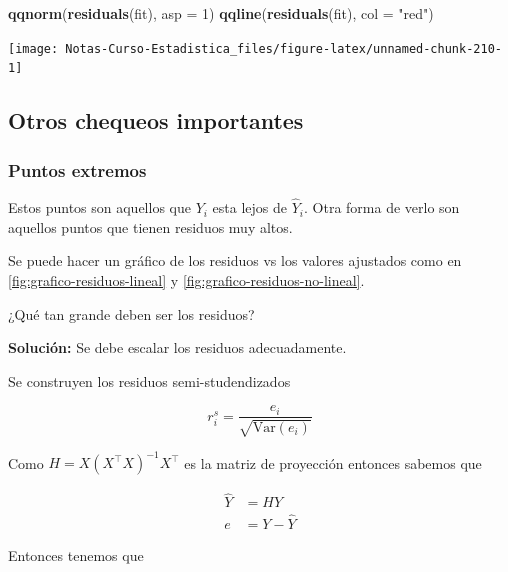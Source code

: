 \documentclass[
  12pt,
]{book}
\newenvironment{Shaded}{\begin{snugshade}}{\end{snugshade}}
\newcommand{\DataTypeTok}[1]{\textcolor[rgb]{0.13,0.29,0.53}{#1}}
\newcommand{\DecValTok}[1]{\textcolor[rgb]{0.00,0.00,0.81}{#1}}
\newcommand{\KeywordTok}[1]{\textcolor[rgb]{0.13,0.29,0.53}{\textbf{#1}}}
\newcommand{\NormalTok}[1]{#1}
\newcommand{\StringTok}[1]{\textcolor[rgb]{0.31,0.60,0.02}{#1}}
\theoremstyle{definition}
\theoremstyle{definition}
\theoremstyle{definition}
\theoremstyle{remark}
\begin{document}
\begin{Shaded}
\begin{Highlighting}[]
\KeywordTok{qqnorm}\NormalTok{(}\KeywordTok{residuals}\NormalTok{(fit), }\DataTypeTok{asp =} \DecValTok{1}\NormalTok{)}
\KeywordTok{qqline}\NormalTok{(}\KeywordTok{residuals}\NormalTok{(fit), }\DataTypeTok{col =} \StringTok{"red"}\NormalTok{)}
\end{Highlighting}
\end{Shaded}

\begin{center}\texttt{[image: Notas-Curso-Estadistica\_files/figure-latex/unnamed-chunk-210-1]} \end{center}

\hypertarget{otros-chequeos-importantes}{%
\subsection{Otros chequeos importantes}\label{otros-chequeos-importantes}}

\hypertarget{puntos-extremos}{%
\subsubsection{Puntos extremos}\label{puntos-extremos}}

Estos puntos son aquellos que \(Y_i\) esta lejos de \(\hat{Y}_i\). Otra forma de verlo son aquellos puntos que tienen residuos muy altos.

Se puede hacer un gráfico de los residuos vs los valores ajustados como en \ref{fig:grafico-residuos-lineal} y \ref{fig:grafico-residuos-no-lineal}.

¿Qué tan grande deben ser los residuos?

\textbf{Solución:} Se debe escalar los residuos adecuadamente.

Se construyen los residuos semi-studendizados

\begin{equation*}
r_{i}^{s} = \frac{e_{i}}{\sqrt{\mathrm{Var}\left(e_{i}\right)}} 
\end{equation*}

Como \(H=X(X^{\top}X)^{-1}X^{\top}\) es la matriz de proyección entonces sabemos que

\begin{align*}
\hat{Y}&=  H Y \\
e &= Y - \hat{Y}  
\end{align*}

Entonces tenemos que
\end{document}
